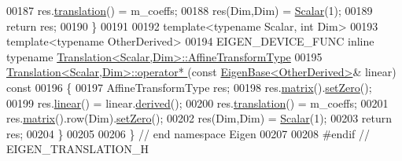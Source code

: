 \begin{DoxyCode}
00187   res.\hyperlink{group___geometry___module_afa93ba97d26912bb3d8777cbed102045}{translation}() = m\_coeffs;
00188   res(Dim,Dim) = \hyperlink{group___geometry___module_ad596bf21ced4b902cc242205df486e21}{Scalar}(1);
00189   \textcolor{keywordflow}{return} res;
00190 \}
00191 
00192 \textcolor{keyword}{template}<\textcolor{keyword}{typename} Scalar, \textcolor{keywordtype}{int} Dim>
00193 \textcolor{keyword}{template}<\textcolor{keyword}{typename} OtherDerived>
00194 EIGEN\_DEVICE\_FUNC \textcolor{keyword}{inline} \textcolor{keyword}{typename} \hyperlink{group___geometry___module_class_eigen_1_1_transform}{Translation<Scalar,Dim>::AffineTransformType}
00195 \hyperlink{group___geometry___module_abfbbd7dee9da6e449439a138c6ce9068}{Translation<Scalar,Dim>::operator* }(\textcolor{keyword}{const} 
      \hyperlink{group___core___module_struct_eigen_1_1_eigen_base}{EigenBase<OtherDerived>}& linear)\textcolor{keyword}{ const}
00196 \textcolor{keyword}{}\{
00197   AffineTransformType res;
00198   res.\hyperlink{group___geometry___module_aec8168000a88a807130d41020af98d47}{matrix}().\hyperlink{class_eigen_1_1_plain_object_base_ac21ad5f989f320e46958b75ac8d9a1da}{setZero}();
00199   res.\hyperlink{group___geometry___module_a535bd63d047c2a36585c3f9b62219a1e}{linear}() = linear.\hyperlink{group___core___module_a324b16961a11d2ecfd2d1b7dd7946545}{derived}();
00200   res.\hyperlink{group___geometry___module_afa93ba97d26912bb3d8777cbed102045}{translation}() = m\_coeffs;
00201   res.\hyperlink{group___geometry___module_aec8168000a88a807130d41020af98d47}{matrix}().row(Dim).\hyperlink{class_eigen_1_1_plain_object_base_ac21ad5f989f320e46958b75ac8d9a1da}{setZero}();
00202   res(Dim,Dim) = \hyperlink{group___geometry___module_ad596bf21ced4b902cc242205df486e21}{Scalar}(1);
00203   \textcolor{keywordflow}{return} res;
00204 \}
00205 
00206 \} \textcolor{comment}{// end namespace Eigen}
00207 
00208 \textcolor{preprocessor}{#endif // EIGEN\_TRANSLATION\_H}
\end{DoxyCode}
